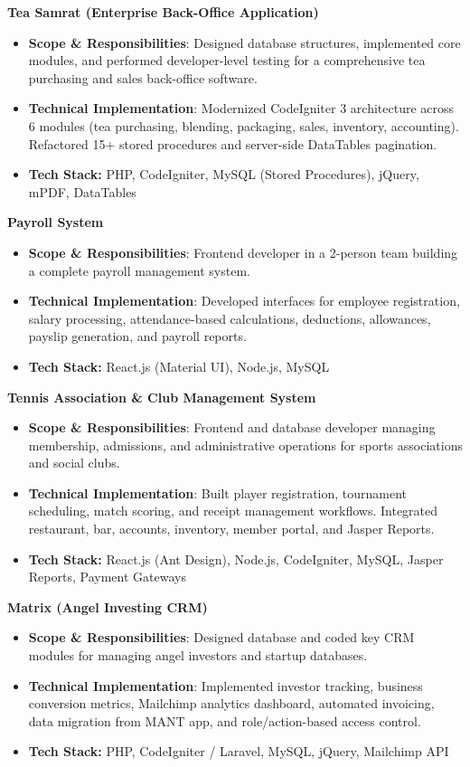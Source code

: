 \documentclass[letterpaper,11pt]{article}
\newcommand{\resumeItem}[2]{
  \item\small{
    \textbf{#1}{: #2 \vspace{-2pt}}
  }
}
\newcommand{\resumeItemPlain}[1]{
  \item\small{
    {#1 \vspace{-2pt}}
  }
}
\begin{document}
    \resumeItemPlain{\textbf{Tea Samrat (Enterprise Back-Office Application)}}
    \begin{itemize}[leftmargin=1.5em, label=$\circ$]
      \resumeItem{Scope \& Responsibilities}{Designed database structures, implemented core modules, and performed developer-level testing for a comprehensive tea purchasing and sales back-office software.}
      \resumeItem{Technical Implementation}{Modernized CodeIgniter 3 architecture across 6 modules (tea purchasing, blending, packaging, sales, inventory, accounting). Refactored 15+ stored procedures and server-side DataTables pagination.}
      \resumeItemPlain{\textbf{Tech Stack:} PHP, CodeIgniter, MySQL (Stored Procedures), jQuery, mPDF, DataTables}
    \end{itemize}

    \resumeItemPlain{\textbf{Payroll System}}
    \begin{itemize}[leftmargin=1.5em, label=$\circ$]
      \resumeItem{Scope \& Responsibilities}{Frontend developer in a 2-person team building a complete payroll management system.}
      \resumeItem{Technical Implementation}{Developed interfaces for employee registration, salary processing, attendance-based calculations, deductions, allowances, payslip generation, and payroll reports.}
      \resumeItemPlain{\textbf{Tech Stack:} React.js (Material UI), Node.js, MySQL}
    \end{itemize}

    \resumeItemPlain{\textbf{Tennis Association \& Club Management System}}
    \begin{itemize}[leftmargin=1.5em, label=$\circ$]
      \resumeItem{Scope \& Responsibilities}{Frontend and database developer managing membership, admissions, and administrative operations for sports associations and social clubs.}
      \resumeItem{Technical Implementation}{Built player registration, tournament scheduling, match scoring, and receipt management workflows. Integrated restaurant, bar, accounts, inventory, member portal, and Jasper Reports.}
      \resumeItemPlain{\textbf{Tech Stack:} React.js (Ant Design), Node.js, CodeIgniter, MySQL, Jasper Reports, Payment Gateways}
    \end{itemize}

    \resumeItemPlain{\textbf{Matrix (Angel Investing CRM)}}
    \begin{itemize}[leftmargin=1.5em, label=$\circ$]
      \resumeItem{Scope \& Responsibilities}{Designed database and coded key CRM modules for managing angel investors and startup databases.}
      \resumeItem{Technical Implementation}{Implemented investor tracking, business conversion metrics, Mailchimp analytics dashboard, automated invoicing, data migration from MANT app, and role/action-based access control.}
      \resumeItemPlain{\textbf{Tech Stack:} PHP, CodeIgniter / Laravel, MySQL, jQuery, Mailchimp API}
    \end{itemize}
\end{document}
